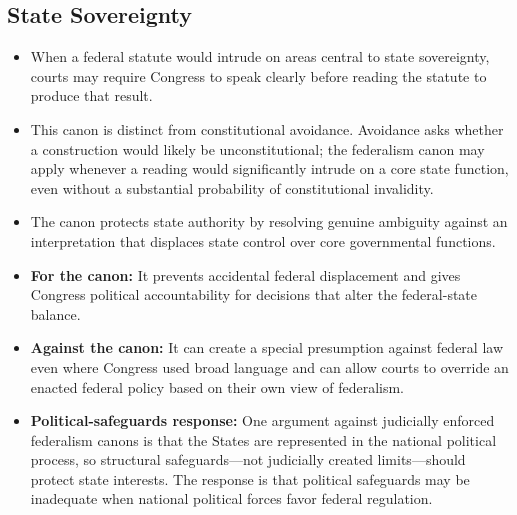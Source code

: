\documentclass[11pt]{tex/lawoutline}
\begin{document}
\subsection{State Sovereignty}

{
\begin{itemize}
    \item When a federal statute would intrude on areas central to state sovereignty, courts may require Congress to speak clearly before reading the statute to produce that result.
    \item This canon is distinct from constitutional avoidance. Avoidance asks whether a construction would likely be unconstitutional; the federalism canon may apply whenever a reading would significantly intrude on a core state function, even without a substantial probability of constitutional invalidity.
    \item The canon protects state authority by resolving genuine ambiguity against an interpretation that displaces state control over core governmental functions.
    \item \textbf{For the canon:} It prevents accidental federal displacement and gives Congress political accountability for decisions that alter the federal-state balance.
    \item \textbf{Against the canon:} It can create a special presumption against federal law even where Congress used broad language and can allow courts to override an enacted federal policy based on their own view of federalism.
    \item \textbf{Political-safeguards response:} One argument against judicially enforced federalism canons is that the States are represented in the national political process, so structural safeguards---not judicially created limits---should protect state interests. The response is that political safeguards may be inadequate when national political forces favor federal regulation.
\end{itemize}
}
\end{document}
